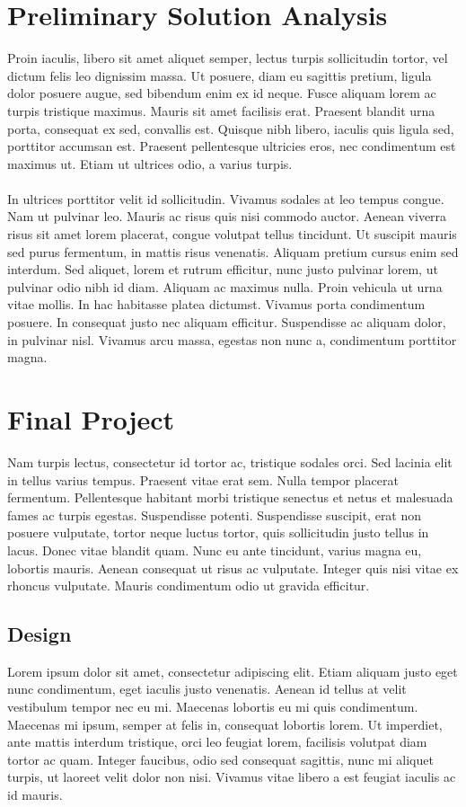 \documentclass[11pt,a4paper]{article}
\begin{document}
\section{Preliminary Solution Analysis}
Proin iaculis, libero sit amet aliquet semper, lectus turpis sollicitudin tortor, vel dictum felis leo dignissim massa. Ut posuere, diam eu sagittis pretium, ligula dolor posuere augue, sed bibendum enim ex id neque. Fusce aliquam lorem ac turpis tristique maximus. Mauris sit amet facilisis erat. Praesent blandit urna porta, consequat ex sed, convallis est. Quisque nibh libero, iaculis quis ligula sed, porttitor accumsan est. Praesent pellentesque ultricies eros, nec condimentum est maximus ut. Etiam ut ultrices odio, a varius turpis.\\
\\
In ultrices porttitor velit id sollicitudin. Vivamus sodales at leo tempus congue. Nam ut pulvinar leo. Mauris ac risus quis nisi commodo auctor. Aenean viverra risus sit amet lorem placerat, congue volutpat tellus tincidunt. Ut suscipit mauris sed purus fermentum, in mattis risus venenatis. Aliquam pretium cursus enim sed interdum. Sed aliquet, lorem et rutrum efficitur, nunc justo pulvinar lorem, ut pulvinar odio nibh id diam. Aliquam ac maximus nulla. Proin vehicula ut urna vitae mollis. In hac habitasse platea dictumst. Vivamus porta condimentum posuere. In consequat justo nec aliquam efficitur. Suspendisse ac aliquam dolor, in pulvinar nisl. Vivamus arcu massa, egestas non nunc a, condimentum porttitor magna.
\section{Final Project}
Nam turpis lectus, consectetur id tortor ac, tristique sodales orci. Sed lacinia elit in tellus varius tempus. Praesent vitae erat sem. Nulla tempor placerat fermentum. Pellentesque habitant morbi tristique senectus et netus et malesuada fames ac turpis egestas. Suspendisse potenti. Suspendisse suscipit, erat non posuere vulputate, tortor neque luctus tortor, quis sollicitudin justo tellus in lacus. Donec vitae blandit quam. Nunc eu ante tincidunt, varius magna eu, lobortis mauris. Aenean consequat ut risus ac vulputate. Integer quis nisi vitae ex rhoncus vulputate. Mauris condimentum odio ut gravida efficitur.
\subsection{Design}
Lorem ipsum dolor sit amet, consectetur adipiscing elit. Etiam aliquam justo eget nunc condimentum, eget iaculis justo venenatis. Aenean id tellus at velit vestibulum tempor nec eu mi. Maecenas lobortis eu mi quis condimentum. Maecenas mi ipsum, semper at felis in, consequat lobortis lorem. Ut imperdiet, ante mattis interdum tristique, orci leo feugiat lorem, facilisis volutpat diam tortor ac quam. Integer faucibus, odio sed consequat sagittis, nunc mi aliquet turpis, ut laoreet velit dolor non nisi. Vivamus vitae libero a est feugiat iaculis ac id mauris.
\end{document}
